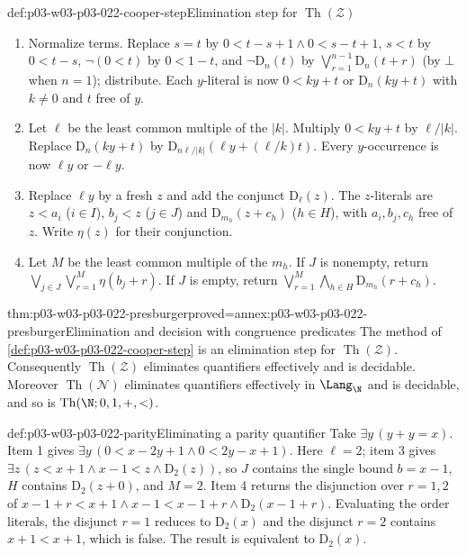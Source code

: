 \begin{hbmethod}{def:p03-w03-p03-022-cooper-step}{Elimination step for \(\operatorname{Th}(\mathcal Z)\)}
\begin{enumerate}
\item Normalize terms. Replace \(s=t\) by \(0<t-s+1\land0<s-t+1\),
  \(s<t\) by \(0<t-s\), \(\neg(0<t)\) by \(0<1-t\), and
  \(\neg\mathrm D_n(t)\) by \(\bigvee_{r=1}^{n-1}\mathrm D_n(t+r)\) (by
  \(\bot\) when \(n=1\)); distribute. Each \(y\)-literal is now
  \(0<ky+t\) or \(\mathrm D_n(ky+t)\) with \(k\ne0\) and \(t\) free of
  \(y\).
\item Let \(\ell\) be the least common multiple of the \(|k|\). Multiply
  \(0<ky+t\) by \(\ell/|k|\). Replace \(\mathrm D_n(ky+t)\) by
  \(\mathrm D_{n\ell/|k|}(\ell y+(\ell/k)t)\). Every \(y\)-occurrence is now
  \(\ell y\) or \(-\ell y\).
\item Replace \(\ell y\) by a fresh \(z\) and add the conjunct
  \(\mathrm D_\ell(z)\). The \(z\)-literals are \(z<a_i\) (\(i\in I\)),
  \(b_j<z\) (\(j\in J\)) and \(\mathrm D_{m_h}(z+c_h)\) (\(h\in H\)), with
  \(a_i,b_j,c_h\) free of \(z\). Write \(\eta(z)\) for their conjunction.
\item Let \(M\) be the least common multiple of the \(m_h\). If \(J\) is
  nonempty, return \(\bigvee_{j\in J}\bigvee_{r=1}^M\eta(b_j+r)\). If
  \(J\) is empty, return
  \(\bigvee_{r=1}^M\bigwedge_{h\in H}\mathrm D_{m_h}(r+c_h)\).
\end{enumerate}
\end{hbmethod}

\begin{hbtheorem}{thm:p03-w03-p03-022-presburger}{proved=annex:p03-w03-p03-022-presburger}{Elimination and decision with congruence predicates}
The method of \cref{def:p03-w03-p03-022-cooper-step} is an elimination step
for \(\operatorname{Th}(\mathcal Z)\). Consequently \(\operatorname{Th}(\mathcal Z)\) eliminates
quantifiers effectively and is decidable. Moreover
\(\operatorname{Th}(\mathcal N)\) eliminates quantifiers effectively in
\(\Lang_{\N}\) and is decidable, and so is
\(\operatorname{Th}(\N;0,1,+,<)\).
\end{hbtheorem}

\begin{hbexample}{def:p03-w03-p03-022-parity}{Eliminating a parity quantifier}
Take \(\exists y\,(y+y=x)\). Item 1 gives
\(\exists y\,(0<x-2y+1\land0<2y-x+1)\). Here \(\ell=2\); item 3 gives
\(\exists z\,(z<x+1\land x-1<z\land\mathrm D_2(z))\), so
\(J\) contains the single bound \(b=x-1\), \(H\) contains \(\mathrm D_2(z+0)\),
and \(M=2\). Item 4 returns the disjunction over \(r=1,2\) of
\(x-1+r<x+1\land x-1<x-1+r\land\mathrm D_2(x-1+r)\). Evaluating the
order literals, the disjunct \(r=1\) reduces to \(\mathrm D_2(x)\) and the
disjunct \(r=2\) contains \(x+1<x+1\), which is false. The result is
equivalent to \(\mathrm D_2(x)\).
\end{hbexample}

